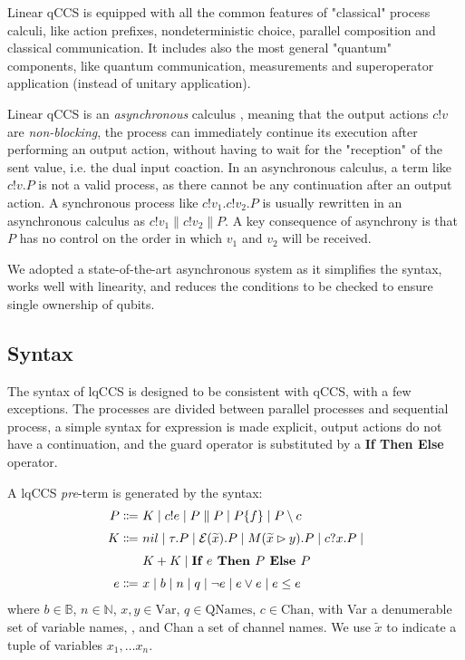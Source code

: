 Linear qCCS is equipped with all the common features of "classical" process calculi, like action prefixes, nondeterministic choice, parallel composition and classical communication. It includes also the most general "quantum" components, like quantum communication, measurements and superoperator application (instead of unitary application). 


Linear qCCS is an \textit{asynchronous} calculus  \cite{boudolAsynchronyPicalculus1992}, meaning that the output actions $c!v$ are \textit{non-blocking}, the process can immediately continue its execution after performing an output action, without having to wait for the "reception" of the sent value, i.e. the dual input coaction. In an asynchronous calculus, a term like $c!v.P$ is not a valid process, as there cannot be any continuation after an output action. A synchronous process like $c!v_1.c!v_2.P$ is usually rewritten in an asynchronous calculus as $c!v_1 \parallel c!v_2 \parallel P$. A key consequence of asynchrony is that $P$ has no control on the order in which $v_1$ and $v_2$ will be received.

We adopted a state-of-the-art asynchronous system as it simplifies the syntax, works well with linearity, and reduces the conditions to be checked to ensure single ownership of qubits.

\subsection{Syntax}

The syntax of lqCCS is designed to be consistent with qCCS, with a few exceptions. The processes are divided between parallel processes and sequential process, a simple syntax for expression is made explicit, output actions do not have a continuation, and the guard operator is substituted by a \textbf{If Then Else} operator.

A lqCCS \textit{pre}-term is generated by the syntax:
\begin{align*}
  P \Coloneqq &\ K \mid c!e \mid P \parallel P  \mid  P \{f\} \mid P \setminus c\\[0.1cm]
  K \Coloneqq &\ nil \mid \tau . P \mid \mathcal{E}(\widetilde{x}) . P \mid M(\widetilde{x} \rhd y) . P \mid c?x . P \mid \\[0.1cm]
  &\ K + K \mid \textbf{If }{e}\textbf{ Then } {P} \textbf{ Else } {P} \\[0.1cm]
  e \Coloneqq &\ x \mid b \mid n \mid q \mid \neg e \mid e \lor e \mid e \leq e
\end{align*}	
where $b \in \mathbb{B}$, $n \in \mathbb{N}$, $x, y \in \text{Var}$, $q \in \text{QNames}$, $c \in \text{Chan}$, with Var a denumerable set of variable names, , and Chan a set of channel names. We use $\widetilde{x}$ to indicate a tuple of variables $x_1, \ldots x_n$.

